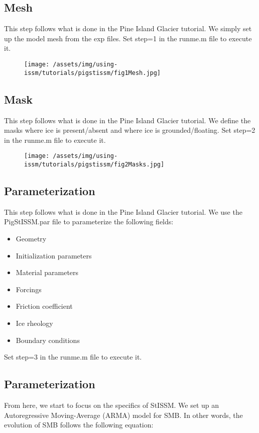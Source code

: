 \subsection{Mesh}%
This step follows what is done in the Pine Island Glacier tutorial. We simply set up the model mesh from the exp files. Set step=1 in the runme.m file to execute it.
\begin{figure}
	\begin{center}
		\texttt{[image: /assets/img/using-issm/tutorials/pigstissm/fig1Mesh.jpg]}
	\end{center}
\end{figure}

\subsection{Mask}%
This step follows what is done in the Pine Island Glacier tutorial. We define the masks where ice is present/absent and where ice is grounded/floating. Set step=2 in the runme.m file to execute it.
\begin{figure}
	\begin{center}
		\texttt{[image: /assets/img/using-issm/tutorials/pigstissm/fig2Masks.jpg]}
	\end{center}
\end{figure}

\subsection{Parameterization}%
This step follows what is done in the Pine Island Glacier tutorial. We use the PigStISSM.par file to parameterize the following fields:
\begin{itemize}
	\item Geometry
	\item Initialization parameters
	\item Material parameters
	\item Forcings
	\item Friction coefficient
	\item Ice rheology
	\item Boundary conditions
\end{itemize}
Set step=3 in the runme.m file to execute it.

\subsection{Parameterization}%
From here, we start to focus on the specifics of StISSM. We set up an Autoregressive Moving-Average (ARMA) model for SMB. In other words, the evolution of SMB follows the following equation:

